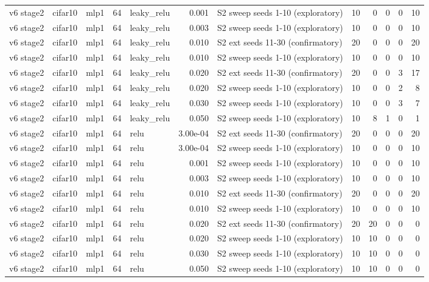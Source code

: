 \begin{table}[htbp]
{\begin{tabular}{@{}lllrlrlrrrrr@{}}
v6 stage2 & cifar10 & mlp1 & 64 & leaky\_relu & 0.001 & S2 sweep seeds 1-10 (exploratory) & 10 & 0 & 0 & 0 & 10 \\
v6 stage2 & cifar10 & mlp1 & 64 & leaky\_relu & 0.003 & S2 sweep seeds 1-10 (exploratory) & 10 & 0 & 0 & 0 & 10 \\
v6 stage2 & cifar10 & mlp1 & 64 & leaky\_relu & 0.010 & S2 ext seeds 11-30 (confirmatory) & 20 & 0 & 0 & 0 & 20 \\
v6 stage2 & cifar10 & mlp1 & 64 & leaky\_relu & 0.010 & S2 sweep seeds 1-10 (exploratory) & 10 & 0 & 0 & 0 & 10 \\
v6 stage2 & cifar10 & mlp1 & 64 & leaky\_relu & 0.020 & S2 ext seeds 11-30 (confirmatory) & 20 & 0 & 0 & 3 & 17 \\
v6 stage2 & cifar10 & mlp1 & 64 & leaky\_relu & 0.020 & S2 sweep seeds 1-10 (exploratory) & 10 & 0 & 0 & 2 & 8 \\
v6 stage2 & cifar10 & mlp1 & 64 & leaky\_relu & 0.030 & S2 sweep seeds 1-10 (exploratory) & 10 & 0 & 0 & 3 & 7 \\
v6 stage2 & cifar10 & mlp1 & 64 & leaky\_relu & 0.050 & S2 sweep seeds 1-10 (exploratory) & 10 & 8 & 1 & 0 & 1 \\
v6 stage2 & cifar10 & mlp1 & 64 & relu & 3.00e-04 & S2 ext seeds 11-30 (confirmatory) & 20 & 0 & 0 & 0 & 20 \\
v6 stage2 & cifar10 & mlp1 & 64 & relu & 3.00e-04 & S2 sweep seeds 1-10 (exploratory) & 10 & 0 & 0 & 0 & 10 \\
v6 stage2 & cifar10 & mlp1 & 64 & relu & 0.001 & S2 sweep seeds 1-10 (exploratory) & 10 & 0 & 0 & 0 & 10 \\
v6 stage2 & cifar10 & mlp1 & 64 & relu & 0.003 & S2 sweep seeds 1-10 (exploratory) & 10 & 0 & 0 & 0 & 10 \\
v6 stage2 & cifar10 & mlp1 & 64 & relu & 0.010 & S2 ext seeds 11-30 (confirmatory) & 20 & 0 & 0 & 0 & 20 \\
v6 stage2 & cifar10 & mlp1 & 64 & relu & 0.010 & S2 sweep seeds 1-10 (exploratory) & 10 & 0 & 0 & 0 & 10 \\
v6 stage2 & cifar10 & mlp1 & 64 & relu & 0.020 & S2 ext seeds 11-30 (confirmatory) & 20 & 20 & 0 & 0 & 0 \\
v6 stage2 & cifar10 & mlp1 & 64 & relu & 0.020 & S2 sweep seeds 1-10 (exploratory) & 10 & 10 & 0 & 0 & 0 \\
v6 stage2 & cifar10 & mlp1 & 64 & relu & 0.030 & S2 sweep seeds 1-10 (exploratory) & 10 & 10 & 0 & 0 & 0 \\
v6 stage2 & cifar10 & mlp1 & 64 & relu & 0.050 & S2 sweep seeds 1-10 (exploratory) & 10 & 10 & 0 & 0 & 0 \\

\end{tabular}}
\end{table}
